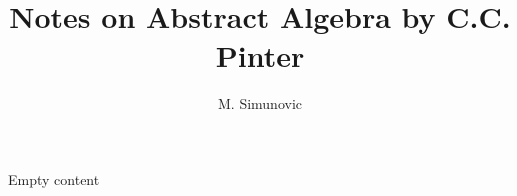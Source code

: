 \documentclass[12pt]{article}
\title{Notes on Abstract Algebra by C.C. Pinter}
\author{M. Simunovic}
\begin{document}
\maketitle
Empty content
\end{document}
